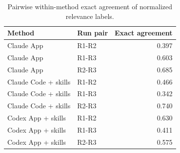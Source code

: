 ﻿\begin{table}[ht]
\centering
\small
\caption{Pairwise within-method exact agreement of normalized relevance labels.}
\label{tab:s_pairwise_agreement}
\begin{tabular}{llr}
\toprule
Method & Run pair & Exact agreement\\
\midrule
Claude App & R1-R2 & 0.397\\
Claude App & R1-R3 & 0.603\\
Claude App & R2-R3 & 0.685\\
Claude Code + skills & R1-R2 & 0.466\\
Claude Code + skills & R1-R3 & 0.342\\
Claude Code + skills & R2-R3 & 0.740\\
Codex App + skills & R1-R2 & 0.630\\
Codex App + skills & R1-R3 & 0.411\\
Codex App + skills & R2-R3 & 0.575\\
\bottomrule
\end{tabular}
\end{table}
